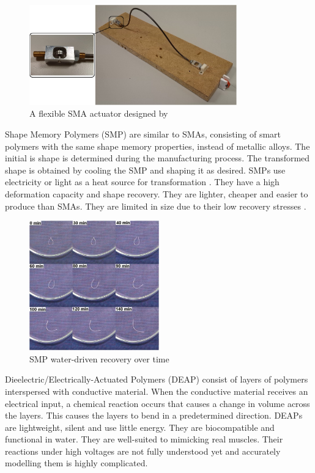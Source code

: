 \begin{figure}[H]
	\centering
	\includegraphics[width=0.8\textwidth]{SMA.png}
	\caption{A flexible SMA actuator designed by \cite{Villoslada2015}}
	\label{fig:sma}
\end{figure}

Shape Memory Polymers (SMP) are similar to SMAs, consisting of smart polymers with the same shape memory properties, instead of metallic alloys. The initial is shape is determined during the manufacturing process. The transformed shape is obtained by cooling the SMP and shaping it as desired. SMPs use electricity or light as a heat source for transformation \citep{Behl2007}. They have a high deformation capacity and shape recovery. They are lighter, cheaper and easier to produce than SMAs. They are limited in size due to their low recovery stresses \citep{Huang2005, Rodriguez2016, Behl2007}.

\begin{figure}[H]
	\centering
	\includegraphics[width=0.5\textwidth]{SMP.png}
	\caption{SMP water-driven recovery over time \citep{Huang2005}}
	\label{fig:smp}
\end{figure}

Dieelectric/Electrically-Actuated Polymers (DEAP) consist of layers of polymers interspersed with conductive material. When the conductive material receives an electrical input, a chemical reaction occurs that causes a change in volume across the layers. This causes the layers to bend in a predetermined direction. DEAPs are lightweight, silent and use little energy. They are biocompatible and functional in water. They are well-suited to mimicking real muscles. Their reactions under high voltages are not fully understood yet and accurately modelling them is highly complicated. \citep{Mutlu2014}

